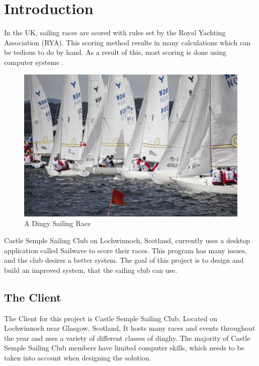 \documentclass{l4proj}
\begin{document}
\chapter{Introduction}


In the UK, sailing races are scored with rules set by the Royal Yachting Association (RYA).
This scoring method results in many calculations which can be tedious to do by hand. As a result of this, most scoring is done using computer systems \citep{RYAscore}.

\begin{figure}[H]
    \centering
    \includegraphics[width=0.7\linewidth]{images/SailingRace.jpg} 

    \caption{A Dingy Sailing Race \citep{SailingRace}
    }

    \label{fig:SailingRace} 
\end{figure}

Castle Semple Sailing Club on Lochwinnoch, Scotland, currently uses a desktop application called Sailwave to score their races. This program has many issues, and the club desires a better system. The goal of this project is to design and build an improved system, that the sailing club can use.

\section{The Client}
The Client for this project is Castle Semple Sailing Club. Located on Lochwinnoch near Glasgow, Scotland, It hosts many races and events throughout the year and uses a variety of different classes of dinghy. The majority of Castle Semple Sailing Club members have limited computer skills, which needs to be taken into account when designing the solution.
\end{document}
